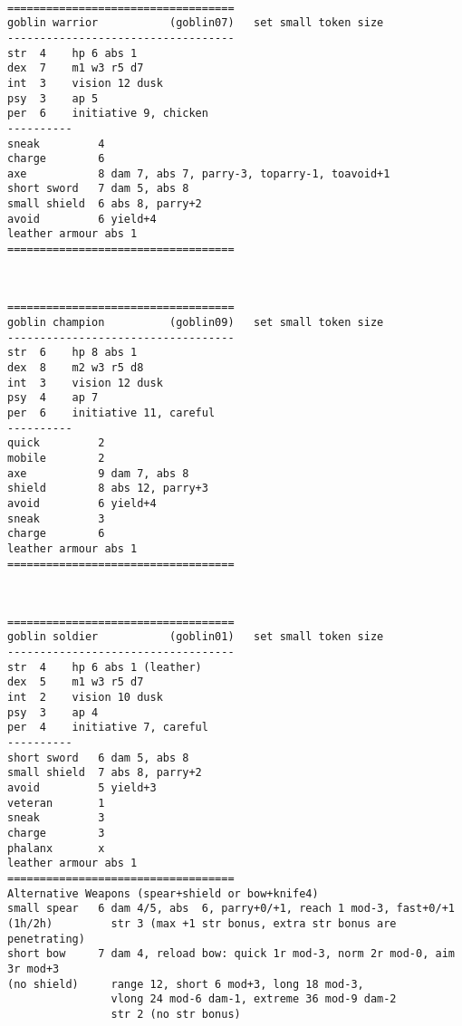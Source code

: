 \

\goodbreak \begin{samepage} \small \begin{verbatim}
===================================
goblin warrior           (goblin07)   set small token size
-----------------------------------
str  4    hp 6 abs 1
dex  7    m1 w3 r5 d7
int  3    vision 12 dusk
psy  3    ap 5
per  6    initiative 9, chicken
----------
sneak         4
charge        6
axe           8 dam 7, abs 7, parry-3, toparry-1, toavoid+1
short sword   7 dam 5, abs 8
small shield  6 abs 8, parry+2
avoid         6 yield+4
leather armour abs 1
===================================
\end{verbatim} \normalsize \end{samepage}

\

\goodbreak \begin{samepage} \small \begin{verbatim}
===================================
goblin champion          (goblin09)   set small token size
-----------------------------------
str  6    hp 8 abs 1
dex  8    m2 w3 r5 d8
int  3    vision 12 dusk
psy  4    ap 7
per  6    initiative 11, careful
----------
quick         2
mobile        2
axe           9 dam 7, abs 8
shield        8 abs 12, parry+3
avoid         6 yield+4
sneak         3
charge        6
leather armour abs 1
===================================
\end{verbatim} \normalsize \end{samepage}

\

\goodbreak \begin{samepage} \small \begin{verbatim}
===================================
goblin soldier           (goblin01)   set small token size
-----------------------------------
str  4    hp 6 abs 1 (leather)
dex  5    m1 w3 r5 d7
int  2    vision 10 dusk
psy  3    ap 4
per  4    initiative 7, careful
----------
short sword   6 dam 5, abs 8
small shield  7 abs 8, parry+2
avoid         5 yield+3
veteran       1
sneak         3
charge        3
phalanx       x
leather armour abs 1
===================================
Alternative Weapons (spear+shield or bow+knife4)
small spear   6 dam 4/5, abs  6, parry+0/+1, reach 1 mod-3, fast+0/+1
(1h/2h)         str 3 (max +1 str bonus, extra str bonus are penetrating)
short bow     7 dam 4, reload bow: quick 1r mod-3, norm 2r mod-0, aim 3r mod+3
(no shield)     range 12, short 6 mod+3, long 18 mod-3,
                vlong 24 mod-6 dam-1, extreme 36 mod-9 dam-2
                str 2 (no str bonus)
\end{verbatim} \normalsize \end{samepage}

